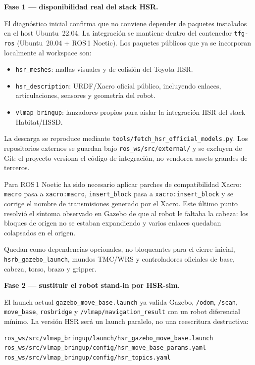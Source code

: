 \documentclass[11pt,a4paper]{article}
\begin{document}
\textbf{Fase 1 --- disponibilidad real del stack HSR.}

El diagnóstico inicial confirma que no conviene depender de paquetes instalados
en el host Ubuntu~22.04. La integración se mantiene dentro del contenedor
\texttt{tfg-ros} (Ubuntu~20.04 + ROS\,1 Noetic). Los paquetes públicos que ya
se incorporan localmente al workspace son:

\begin{itemize}
  \item \texttt{hsr\_meshes}: mallas visuales y de colisión del Toyota HSR.
  \item \texttt{hsr\_description}: URDF/Xacro oficial público, incluyendo
        enlaces, articulaciones, sensores y geometría del robot.
  \item \texttt{vlmap\_bringup}: lanzadores propios para aislar la integración
        HSR del stack Habitat/HSSD.
\end{itemize}

La descarga se reproduce mediante
\texttt{tools/fetch\_hsr\_official\_models.py}. Los repositorios externos se
guardan bajo \texttt{ros\_ws/src/external/} y se excluyen de Git: el proyecto
versiona el código de integración, no vendorea assets grandes de terceros.

Para ROS\,1 Noetic ha sido necesario aplicar parches de compatibilidad Xacro:
\texttt{macro} pasa a \texttt{xacro:macro}, \texttt{insert\_block} pasa a
\texttt{xacro:insert\_block} y se corrige el nombre de transmisiones generado
por el Xacro. Este último punto resolvió el síntoma observado en Gazebo de que
al robot le faltaba la cabeza: los bloques de origen no se estaban expandiendo
y varios enlaces quedaban colapsados en el origen.

Quedan como dependencias opcionales, no bloqueantes para el cierre inicial,
\texttt{hsrb\_gazebo\_launch}, mundos TMC/WRS y controladores oficiales de base,
cabeza, torso, brazo y gripper.

\textbf{Fase 2 --- sustituir el robot stand-in por HSR-sim.}

El launch actual \texttt{gazebo\_move\_base.launch} ya valida Gazebo,
\texttt{/odom}, \texttt{/scan}, \texttt{move\_base}, \texttt{rosbridge} y
\texttt{/vlmap/navigation\_result} con un robot diferencial mínimo. La versión
HSR será un launch paralelo, no una reescritura destructiva:

\begin{verbatim}
ros_ws/src/vlmap_bringup/launch/hsr_gazebo_move_base.launch
ros_ws/src/vlmap_bringup/config/hsr_move_base_params.yaml
ros_ws/src/vlmap_bringup/config/hsr_topics.yaml
\end{verbatim}
\end{document}
